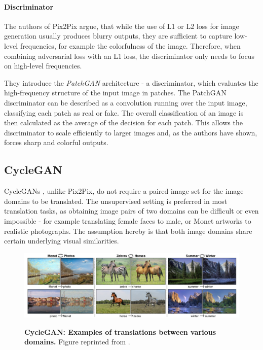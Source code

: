 \documentclass[12pt]{report}
\begin{document}
\paragraph{Discriminator} \label{sec:patchgan}
The authors of Pix2Pix \cite{isola_image--image_2016} argue, that while the use of L1 or L2 loss for image generation usually produces blurry outputs, they are sufficient to capture low-level frequencies, for example the colorfulness of the image. Therefore, when combining adversarial loss with an L1 loss, the discriminator only needs to focus on high-level frequencies. 

They introduce the \textit{PatchGAN} architecture - a discriminator, which evaluates the high-frequency structure of the input image in patches. The PatchGAN discriminator can be described as a convolution running over the input image, classifying each patch as real or fake. The overall classification of an image is then calculated as the average of the decision for each patch. This allows the discriminator to scale efficiently to larger images and, as the authors have shown, forces sharp and colorful outputs.



\pagebreak
\subsection{CycleGAN}
CycleGANs \cite{zhu_unpaired_2017}, unlike Pix2Pix, do not require a paired image set for the image domains to be translated. The unsupervised setting is preferred in most translation tasks, as obtaining image pairs of two domains can be difficult or even impossible - for example translating female faces to male, or Monet artworks to realistic photographs. The assumption hereby is that both image domains share certain underlying visual similarities.

\begin{figure}[h]
\centering
{\includegraphics[width=\linewidth]{03_analysis/gans/cyclegan_example}}
\caption{\label{fig:cyclegan_examples} \textbf{CycleGAN: Examples of translations between various domains.} Figure reprinted from \cite{zhu_unpaired_2017}.}
\end{figure}
\end{document}
